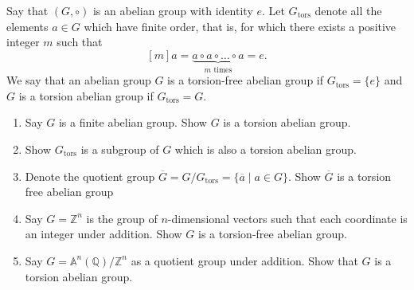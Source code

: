 \documentclass[12 pt, letterpaper]{hmcpset}
\begin{document}
\begin{problem}[Problem 1.]
	Say that $(G, \circ)$ is an abelian group with identity $e$. Let $G_{\text{tors}}$ denote all the elements $a \in G$ which have finite order, that is, for which there exists a positive integer $m$ such that
	\[
		[m]a = \underbrace{a \circ a \circ \dots \circ a}_{m \text{ times}} = e.
	\]
	We say that an abelian group $G$ is a torsion-free abelian group if $G_{\text{tors}} = \{ e \}$ and $G$ is a torsion abelian group if $G_{\text{tors}} = G$.
	\begin{enumerate}
		\item Say $G$ is a finite abelian group. Show $G$ is a torsion abelian group.
		\item Show $G_{\text{tors}}$ is a subgroup of $G$ which is also a torsion abelian group.
		\item Denote the quotient group $\overline{G} = G / G_{\text{tors}} = \{ \overline{a} \mid a \in G \}$. Show $\overline{G}$ is a torsion free abelian group
		\item Say $G = \mathbb{Z}^{n}$ is the group of $n$-dimensional vectors such that each coordinate is an integer under addition. Show $G$ is a torsion-free abelian group.
		\item Say $G = \mathbb{A}^{n}(\mathbb{Q}) / \mathbb{Z}^{n}$ as a quotient group under addition. Show that $G$ is a torsion abelian group.
	\end{enumerate}
\end{problem}
\end{document}
